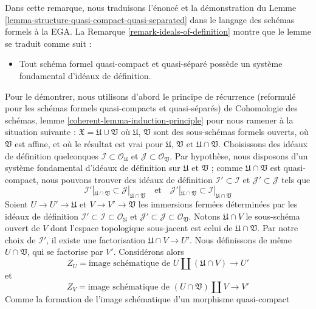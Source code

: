 \begin{remark}
\label{remark-structure-quasi-compact-quasi-separated}
Dans cette remarque, nous traduisons l'énoncé et la démonstration du
Lemme \ref{lemma-structure-quasi-compact-quasi-separated}
dans le langage des schémas formels \`a la EGA.
La Remarque \ref{remark-ideals-of-definition} montre
que le lemme se traduit comme suit :
\begin{itemize}
\item[(*)] Tout schéma formel quasi-compact et quasi-séparé
possède un système fondamental d'idéaux de définition.
\end{itemize}
Pour le démontrer, nous utilisons d'abord le principe de récurrence (reformulé pour les
schémas formels quasi-compacts et quasi-séparés) de
Cohomologie des schémas, lemme \ref{coherent-lemma-induction-principle}
pour nous ramener à la situation suivante :
$\mathfrak X = \mathfrak U \cup \mathfrak V$
où $\mathfrak U$, $\mathfrak V$ sont des sous-schémas formels ouverts,
où $\mathfrak V$ est affine, et où le résultat est vrai pour $\mathfrak U$,
$\mathfrak V$ et $\mathfrak U \cap \mathfrak V$. Choisissons des idéaux
de définition quelconques $\mathcal{I} \subset \mathcal{O}_\mathfrak U$
et $\mathcal{J} \subset \mathcal{O}_\mathfrak V$.
Par hypothèse, nous disposons d'un système fondamental d'idéaux
de définition sur $\mathfrak U$ et $\mathfrak V$ ; comme
$\mathfrak U \cap \mathfrak V$ est quasi-compact, nous pouvons trouver
des idéaux de définition $\mathcal{I}' \subset \mathcal{I}$
et $\mathcal{J}' \subset \mathcal{J}$
tels que
$$
\mathcal{I}'|_{\mathfrak U \cap \mathfrak V} \subset
\mathcal{J}|_{\mathfrak U \cap \mathfrak V}
\quad\text{et}\quad
\mathcal{J}'|_{\mathfrak U \cap \mathfrak V} \subset
\mathcal{I}|_{\mathfrak U \cap \mathfrak V}
$$
Soient $U \to U' \to \mathfrak U$ et $V \to V' \to \mathfrak V$ les
immersions fermées déterminées par les idéaux de définition
$\mathcal{I}' \subset \mathcal{I} \subset \mathcal{O}_\mathfrak U$
et
$\mathcal{J}' \subset \mathcal{J} \subset \mathcal{O}_\mathfrak V$.
Notons $\mathfrak U \cap V$ le sous-schéma ouvert de $V$ dont
l'espace topologique sous-jacent est celui de $\mathfrak U \cap \mathfrak V$.
Par notre choix de $\mathcal{I}'$, il existe une factorisation
$\mathfrak U \cap V \to U'$.
Nous définissons de même $U \cap \mathfrak V$, qui se factorise par $V'$.
Considérons alors
$$
Z_U = \text{image schématique de }
U \amalg (\mathfrak U \cap V) \longrightarrow U'
$$
et
$$
Z_V = \text{image schématique de }
(U \cap \mathfrak V) \amalg V \longrightarrow V'
$$
Comme la formation de l'image schématique d'un morphisme quasi-compact

\end{remark}
